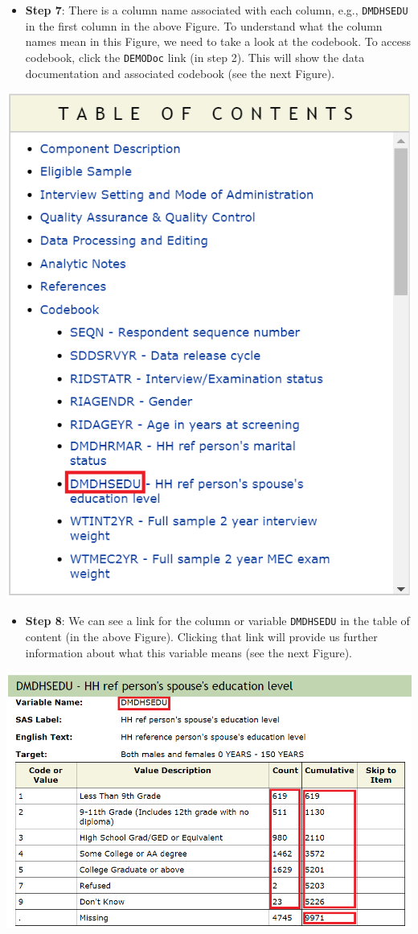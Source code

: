 \documentclass[
]{book}
\providecommand{\tightlist}{%
  \setlength{\itemsep}{0pt}\setlength{\parskip}{0pt}}
\begin{document}
\begin{itemize}
\tightlist
\item
  \textbf{Step 7}: There is a column name associated with each column, e.g., \texttt{DMDHSEDU} in the first column in the above Figure. To understand what the column names mean in this Figure, we need to take a look at the codebook. To access codebook, click the \texttt{\textquotesingle{}DEMO\textbar{}Doc\textquotesingle{}} link (in step 2). This will show the data documentation and associated codebook (see the next Figure).
\end{itemize}

\includegraphics[width=0.65\linewidth]{images/toc}

\begin{itemize}
\tightlist
\item
  \textbf{Step 8}: We can see a link for the column or variable \texttt{DMDHSEDU} in the table of content (in the above Figure). Clicking that link will provide us further information about what this variable means (see the next Figure).
\end{itemize}

\includegraphics[width=0.65\linewidth]{images/DMDHSEDU}
\end{document}
